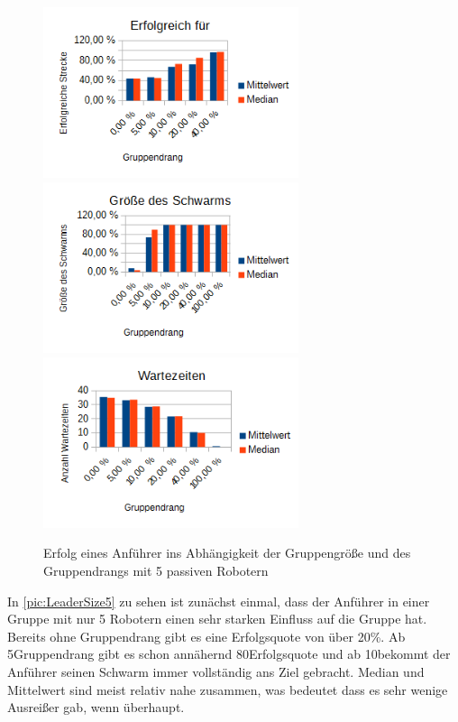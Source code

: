 \newcommand{\sectionLeaderPictureWidth}{7.5cm}
\newcommand{\sectionLeaderPictureHeight}{3.5cm}

\begin{figure}[h]
	\includegraphics[width=\sectionLeaderPictureWidth , keepaspectratio]{graphics/Statistics/Leader/FlockSize/5_1.png}
	\includegraphics[width=\sectionLeaderPictureWidth , keepaspectratio]{graphics/Statistics/Leader/FlockSize/5_2.png}
	\includegraphics[width=\sectionLeaderPictureWidth , keepaspectratio]{graphics/Statistics/Leader/FlockSize/5_3.png}
	\caption{Erfolg eines Anführer ins Abhängigkeit der Gruppengröße und des Gruppendrangs mit 5 passiven Robotern}
	\label{pic:LeaderSize5}
\end{figure}

In \autoref{pic:LeaderSize5} zu sehen ist zunächst einmal, dass der Anführer in einer Gruppe mit nur 5 Robotern einen sehr starken Einfluss auf die Gruppe hat. Bereits ohne Gruppendrang gibt es eine Erfolgsquote von über 20\%. Ab 5\per Gruppendrang gibt es schon annähernd 80\per Erfolgsquote und ab 10\per bekommt der Anführer seinen Schwarm immer vollständig ans Ziel gebracht. Median und Mittelwert sind meist relativ nahe zusammen, was bedeutet dass es sehr wenige Ausreißer gab, wenn überhaupt.

